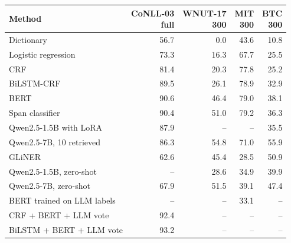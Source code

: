 \begingroup\small\setlength{\tabcolsep}{3pt}
\begin{tabular*}{\linewidth}{@{\extracolsep{\fill}}lrrrr@{}}
\toprule
Method & \shortstack[l]{CoNLL-03 \\ full} & \shortstack[l]{WNUT-17 \\ 300} & \shortstack[l]{MIT \\ 300} & \shortstack[l]{BTC \\ 300} \\
\midrule
Dictionary & 56.7 & 0.0 & 43.6 & 10.8 \\
Logistic regression & 73.3 & 16.3 & 67.7 & 25.5 \\
CRF & 81.4 & 20.3 & 77.8 & 25.2 \\
BiLSTM-CRF & 89.5 & 26.1 & 78.9 & 32.9 \\
BERT & 90.6 & 46.4 & 79.0 & 38.1 \\
Span classifier & 90.4 & 51.0 & 79.2 & 36.3 \\
Qwen2.5-1.5B with LoRA & 87.9 & -- & -- & 35.5 \\
Qwen2.5-7B, 10 retrieved & 86.3 & 54.8 & 71.0 & 55.9 \\
GLiNER & 62.6 & 45.4 & 28.5 & 50.9 \\
Qwen2.5-1.5B, zero-shot & -- & 28.6 & 34.9 & 39.9 \\
Qwen2.5-7B, zero-shot & 67.9 & 51.5 & 39.1 & 47.4 \\
BERT trained on LLM labels & -- & -- & 33.1 & -- \\
CRF + BERT + LLM vote & 92.4 & -- & -- & -- \\
BiLSTM + BERT + LLM vote & 93.2 & -- & -- & -- \\
\bottomrule
\end{tabular*}
\endgroup
\par\medskip
\begingroup\small\setlength{\tabcolsep}{3pt}
